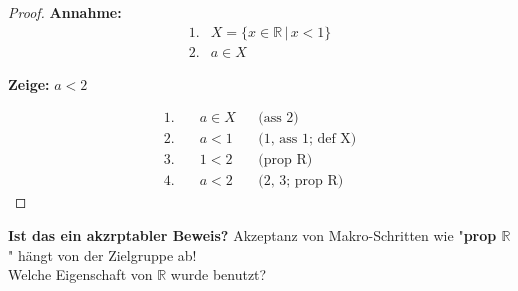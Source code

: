 \begin{proof}
    \textbf{Annahme:}
    \begin{align*}
    1. & X = \{x\in\mathbb{R} \,|\, x<1\} \\
    2. & a\in X
    \end{align*}

    \textbf{Zeige:} $a<2$

    \begin{align*}
    1. &\quad a\in X                   && \text{(ass 2)} \\
    2. &\quad a<1                      && \text{(1, ass 1; def X)} \\
    3. &\quad 1<2                      && \text{(prop R)} \\
    4. &\quad a<2                      && \text{(2, 3; prop R)}
    \end{align*}
\end{proof}
\textbf{Ist das ein akzrptabler Beweis?} Akzeptanz von Makro-Schritten wie "\textbf{prop $\mathbb{R}
$}" hängt von der Zielgruppe ab! \\ Welche Eigenschaft von $\mathbb{R}$ wurde benutzt?
